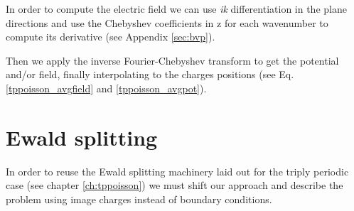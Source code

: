 \documentclass[twoside,openright,titlepage,numbers=noenddot,%
headinclude,footinclude,cleardoublepage=empty,abstract=on,
BCOR=5mm,fontsize=11pt, dvipsnames, paper=b5
]{scrreprt}
\begin{document}
In order to compute the electric field we can use \emph{ik} differentiation in the plane directions and use the Chebyshev coefficients in z for each wavenumber to compute its derivative (see Appendix \ref{sec:bvp}).

Then we apply the inverse Fourier-Chebyshev transform to get the potential and/or field, finally interpolating to the charges positions (see Eq. \eqref{tppoisson_avgfield} and \eqref{tppoisson_avgpot}).


\section{Ewald splitting}\label{sec:dpewald}
In order to reuse the Ewald splitting machinery laid out for the triply periodic case (see chapter \ref{ch:tppoisson}) we must shift our approach and describe the problem using image charges instead of boundary conditions.
\end{document}
